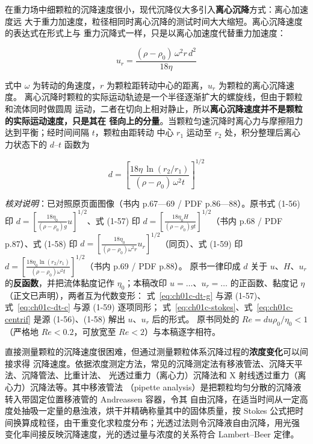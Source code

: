 在重力场中细颗粒的沉降速度很小，现代沉降仪大多引入\textbf{离心沉降}方式：离心加速度远
大于重力加速度，粒径相同时离心沉降的测试时间大大缩短。离心沉降速度的表达式在形式上与
重力沉降式一样，只是以离心加速度代替重力加速度：

\begin{equation}\label{eq:ch01c-centrif}
u_{r}=\frac{(\rho-\rho_{0})\,\omega^{2}r\,d^{2}}{18\eta}
\end{equation}

式中 $\omega$ 为转动的角速度，$r$ 为颗粒距转动中心的距离，$u_r$ 为颗粒的离心沉降速度。
离心沉降时颗粒的实际运动轨迹是一个半径逐渐扩大的螺旋线，但由于颗粒和流体同时做圆周
运动，二者在切向上相对静止，所以\textbf{离心沉降速度并不是颗粒的实际运动速度，只是其在
径向上的分量}。当颗粒匀速沉降时离心力与摩擦阻力达到平衡；经时间间隔 $t$，颗粒由距转动
中心 $r_1$ 运动至 $r_2$ 处，积分整理后离心力状态下的 $d$--$t$ 函数为

\begin{equation}\label{eq:ch01c-dt-c}
d=\left[\frac{18\eta\,\ln\left(r_{2}/r_{1}\right)}{(\rho-\rho_{0})\,\omega^{2}t}\right]^{1/2}
\end{equation}

\emph{核对说明}：已对照原页面图像（书内 p.67—69 / PDF p.86—88）。原书式 (1-56) 印
$d=\left[\frac{18\eta_{0}}{(\rho-\rho_{0})g}u\right]^{1/2}$、式 (1-57) 印
$d=\left[\frac{18\eta_{0}H}{(\rho-\rho_{0})gt}\right]^{1/2}$（书内 p.68 / PDF p.87）、式 (1-58) 印
$d=\left[\frac{18\eta_{0}}{(\rho-\rho_{0})\omega^{2}r}u_{r}\right]^{1/2}$（同页）、式 (1-59) 印
$d=\left[\frac{18\eta_{0}\ln(r_{2}/r_{1})}{(\rho-\rho_{0})\omega^{2}t}\right]^{1/2}$（书内 p.69 / PDF p.88）。
原书一律印成 $d$ 关于 $u$、$H$、$u_r$ 的\textbf{反函数}，并把流体黏度记作 $\eta_0$；本稿改印
$u=\dots$、$u_r=\dots$ 的正函数、黏度记 $\eta$（正文已声明），两者互为代数变形：
式~\eqref{eq:ch01c-dt-g} 与源 (1-57)、式~\eqref{eq:ch01c-dt-c} 与源 (1-59) 逐项同形；
式~\eqref{eq:ch01c-stokes}、式~\eqref{eq:ch01c-centrif} 是源 (1-56)、(1-58) 解出 $u$、$u_r$ 后的形式。
原书同处的 $Re=du\rho_{0}/\eta_{0}<1$（严格地 $Re<0.2$，可放宽至 $Re<2$）与本稿逐字相符。

直接测量颗粒的沉降速度很困难，但通过测量颗粒体系沉降过程的\textbf{浓度变化}可以间接求得
沉降速度。依据浓度测定方法，常见的沉降测定法有移液管法、沉降天平法、沉降管法、比重计法、
光透过重力（离心力）沉降法和 X 射线透过重力（离心力）沉降法等。其中移液管法
（pipette analysis）是把颗粒均匀分散的沉降液转入带固定位置移液管的 Andreassen 容器，令其
自由沉降，在适当时间从一定高度处抽吸一定量的悬浊液，烘干并精确称量其中的固体质量，按
Stokes 公式把时间换算成粒径，由干重变化求粒度分布；光透过法则令沉降液自由沉降，用光强
变化率间接反映沉降速度，光的透过量与浓度的关系符合 Lambert--Beer 定律。

